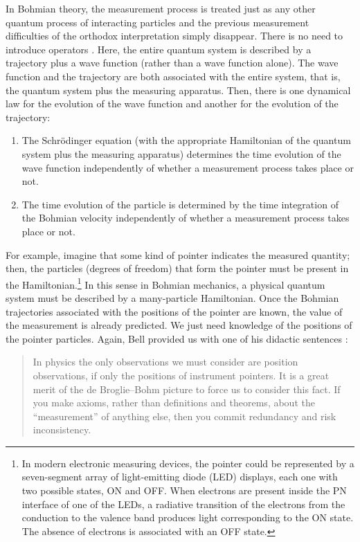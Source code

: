 \documentclass[onecolumn,nofootinbib, secnumarabic, amsmath, nobibnotes,12pt,aps,pra]{revtex4-1}
\begin{document}
In Bohmian theory, the measurement process is treated just as any
other quantum process of interacting particles and the previous
measurement difficulties of the orthodox interpretation simply
disappear. There is no need to introduce operators
\cite{om.Durrnaive,om.Durrllibre,om.goldstein}. Here, the entire
quantum system is described by a trajectory plus a wave function
(rather than a wave function alone). The wave function and the
trajectory are both associated with the entire system, that is, the
quantum system plus the measuring apparatus. Then, there is one dynamical law for
the evolution of the wave function and another  for the
evolution of the trajectory:\enlargethispage{1pc}
\begin{enumerate}
\item The Schr\"odinger equation (with the appropriate Hamiltonian of the quantum system plus the measuring apparatus) determines the time evolution of the wave function independently of whether a measurement process takes place or not.

\item The time evolution of the particle is determined by the time integration of the Bohmian velocity independently of whether a measurement process takes place or not.
\end{enumerate}

For example, imagine that some kind of pointer indicates the
measured quantity; then, the particles (degrees of freedom) that
form the pointer must be present in the Hamiltonian.\footnote{In
modern electronic measuring devices, the pointer could be
represented by a seven-segment array of light-emitting diode (LED)
displays, each one with two possible states, ON and OFF. When
electrons are present inside the PN interface of one of the LEDs, a
radiative transition of the electrons from the conduction to the
valence band produces light corresponding to the ON state. The
absence of electrons is associated with an OFF state.} In this
sense in Bohmian mechanics,  a physical quantum system must be described by a
many-particle Hamiltonian. Once the Bohmian
trajectories associated with the positions of the pointer are known,
the value of the measurement is already predicted. We just need
knowledge of the positions of the pointer particles. Again, Bell
provided us with one of his didactic sentences \cite{om.Bell1987}:
\begin{quote}
In physics the only observations we must consider are position
observations, if only the positions of instrument pointers. It is a
great merit of the de Broglie--Bohm picture to force us to consider
this fact. If you make axioms, rather than definitions and theorems,
about the ``measurement'' of anything else, then you commit
redundancy and risk inconsistency.\enlargethispage{1pc}
\end{quote}
\end{document}
